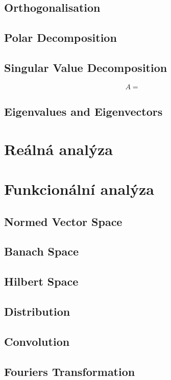 \section{Orthogonalisation}
\section{Polar Decomposition}
\section{Singular Value Decomposition}
    
\begin{equation}
    A = 
\end{equation}

\section{Eigenvalues and Eigenvectors}

\chapter{Reálná analýza}
\section{}

\chapter{Funkcionální analýza}
\section{Normed Vector Space}
\section{Banach Space}
\section{Hilbert Space}
\section{Distribution}
\section{Convolution}
\section{Fouriers Transformation}
